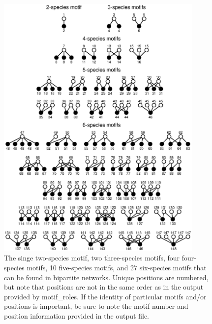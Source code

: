 \documentclass[12pt]{article}
\begin{document}
	\begin{figure}[ht]
	  \centering
		\includegraphics*[width=0.9\textwidth]{bipartite_motifs.eps}
			  \vspace{0.5cm}
		\caption{The singe two-species motif, two three-species motifs, four four-species motifs, 10 five-species motifs, and 27 six-species motifs that can be found in bipartite networks. Unique positions are numbered, but note that positions are not in the same order as in the output provided by motif\_roles. If the identity of particular motifs and/or positions is important, be sure to note the motif number and position information provided in the output file.}
		\label{bipartite_motifs}
	\end{figure}

\clearpage




\clearpage
\end{document}
